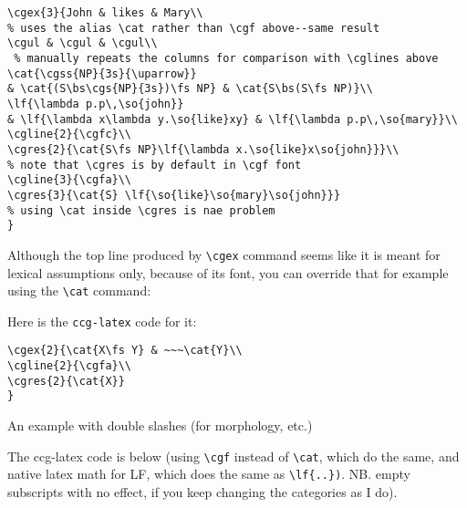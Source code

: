 \documentclass[11pt]{article}
\begin{document}
\begin{verbatim}
\cgex{3}{John & likes & Mary\\ 
% uses the alias \cat rather than \cgf above--same result
\cgul & \cgul & \cgul\\ 
 % manually repeats the columns for comparison with \cglines above 
\cat{\cgss{NP}{3s}{\uparrow}} 
& \cat{(S\bs\cgs{NP}{3s})\fs NP} & \cat{S\bs(S\fs NP)}\\
\lf{\lambda p.p\,\so{john}} 
& \lf{\lambda x\lambda y.\so{like}xy} & \lf{\lambda p.p\,\so{mary}}\\
\cgline{2}{\cgfc}\\
\cgres{2}{\cat{S\fs NP}\lf{\lambda x.\so{like}x\so{john}}}\\  
% note that \cgres is by default in \cgf font
\cgline{3}{\cgfa}\\
\cgres{3}{\cat{S} \lf{\so{like}\so{mary}\so{john}}} 
% using \cat inside \cgres is nae problem
}
\end{verbatim}

Although the top line produced by \verb|\cgex| command seems like it is meant for lexical assumptions only, because of its font, you can override that for example using the \verb|\cat| command:

\medskip

Here is the \verb|ccg-latex| code for it:
\begin{verbatim}
\cgex{2}{\cat{X\fs Y} & ~~~\cat{Y}\\
\cgline{2}{\cgfa}\\
\cgres{2}{\cat{X}}
}
\end{verbatim}
\newpage


An example with double slashes (for morphology, etc.)\bigskip

\bigskip

The ccg-latex code is below (using \verb|\cgf| instead of \verb|\cat|, which do the same, and native latex math for LF, which does the  same as \verb|\lf{..})|. NB. empty subscripts with no effect, if you keep changing the categories as I do).
\end{document}
